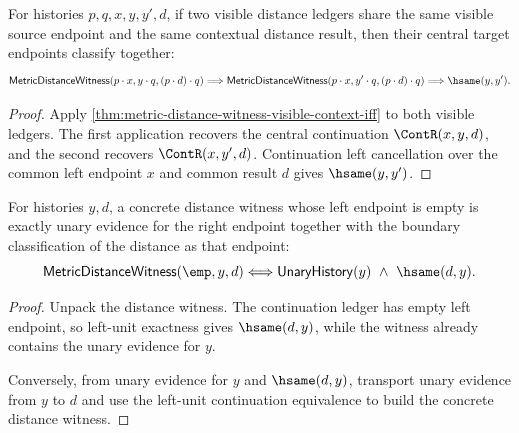\begin{theorem}
\label{thm:metric-distance-witness-visible-context-target-determinacy}
\label{thm:metric-distance-witness-visible-context-target-deterministic}
For histories $p,q,x,y,y',d$, if two visible distance ledgers share the same
visible source endpoint and the same contextual distance result, then their
central target endpoints classify together:
$$
\mathsf{MetricDistanceWitness}(p\cdot x,y\cdot q,(p\cdot d)\cdot q)
\Longrightarrow
\mathsf{MetricDistanceWitness}(p\cdot x,y'\cdot q,(p\cdot d)\cdot q)
\Longrightarrow
\hsame(y,y').
$$
\end{theorem}
\begin{proof}
Apply \autoref{thm:metric-distance-witness-visible-context-iff} to both visible
ledgers. The first application recovers the central continuation
$\ContR(x,y,d)$, and the second recovers $\ContR(x,y',d)$. Continuation left
cancellation over the common left endpoint $x$ and common result $d$ gives
$\hsame(y,y')$.
\end{proof}

\begin{theorem}
\label{thm:metric-distance-witness-empty-left-iff}
For histories $y,d$, a concrete distance witness whose left endpoint is empty
is exactly unary evidence for the right endpoint together with the boundary
classification of the distance as that endpoint:
$$
\mathsf{MetricDistanceWitness}(\emp,y,d)
\Longleftrightarrow
\mathsf{UnaryHistory}(y)\ \wedge\ \hsame(d,y).
$$
\end{theorem}
\begin{proof}
Unpack the distance witness. The continuation ledger has empty left endpoint,
so left-unit exactness gives $\hsame(d,y)$, while the witness already contains
the unary evidence for $y$.

Conversely, from unary evidence for $y$ and $\hsame(d,y)$, transport unary
evidence from $y$ to $d$ and use the left-unit continuation equivalence to build
the concrete distance witness.
\end{proof}



